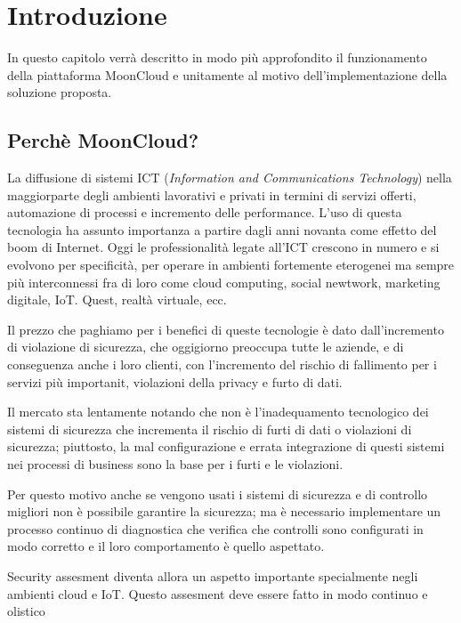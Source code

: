 \chapter{Introduzione}
In questo capitolo verrà descritto in modo più approfondito 
il funzionamento della piattaforma MoonCloud e unitamente al 
motivo dell'implementazione della soluzione proposta.

\section{Perchè MoonCloud?}
La diffusione di sistemi ICT (\textit{Information and Communications Technology})
nella maggiorparte degli ambienti lavorativi e privati in termini di servizi offerti,
automazione di processi e incremento delle performance. L'uso di questa tecnologia 
ha assunto importanza a partire dagli anni novanta come effetto del boom di Internet.
Oggi le professionalità legate all'ICT crescono in numero e si evolvono per 
specificità, per operare in ambienti fortemente eterogenei ma sempre più interconnessi 
fra di loro come cloud computing, social newtwork, marketing digitale, IoT. Quest, realtà virtuale,
ecc.

Il prezzo che paghiamo per i benefici di queste tecnologie è dato dall'incremento di 
violazione di sicurezza, che oggigiorno preoccupa tutte le aziende, e di conseguenza anche i 
loro clienti, con l'incremento del rischio di fallimento per i servizi più importanit, 
violazioni della privacy e furto di dati.

Il mercato sta lentamente notando che non è l'inadequamento tecnologico dei sistemi di sicurezza
che incrementa il rischio di furti di dati o violazioni di sicurezza; piuttosto, la mal configurazione
e errata integrazione di questi sistemi nei processi di business sono la base per 
i furti e le violazioni. \cite{cloud-Platform-for-ICT-Security-Governance}

Per questo motivo anche se vengono usati i sistemi di sicurezza e di controllo migliori non è possibile 
garantire la sicurezza; ma è necessario implementare un processo continuo di diagnostica che verifica che 
controlli sono configurati in modo corretto e il loro comportamento è quello aspettato.

Security assesment diventa allora un aspetto importante specialmente negli ambienti cloud e IoT. Questo 
assesment deve essere fatto in modo continuo e olistico